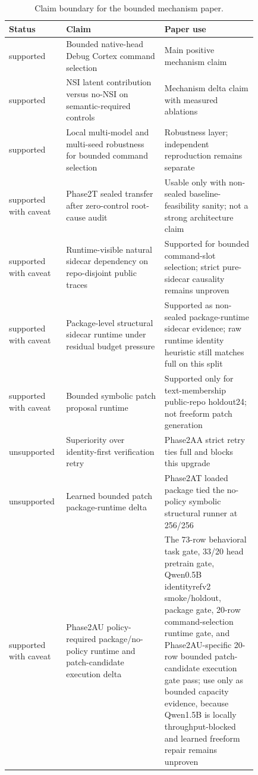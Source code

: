 \begin{table}[ht]
\centering
\scriptsize
\setlength{\tabcolsep}{2pt}
\caption{Claim boundary for the bounded mechanism paper.}
\label{tab:claim-boundary}
\begin{tabular}{@{}>{\raggedright\arraybackslash}p{0.13\linewidth}>{\raggedright\arraybackslash}p{0.36\linewidth}>{\raggedright\arraybackslash}p{0.34\linewidth}@{}}
\toprule
Status & Claim & Paper use \\
\midrule
supported & Bounded native-head Debug Cortex command selection & Main positive mechanism claim \\
supported & NSI latent contribution versus no-NSI on semantic-required controls & Mechanism delta claim with measured ablations \\
supported & Local multi-model and multi-seed robustness for bounded command selection & Robustness layer; independent reproduction remains separate \\
supported with caveat & Phase2T sealed transfer after zero-control root-cause audit & Usable only with non-sealed baseline-feasibility sanity; not a strong architecture claim \\
supported with caveat & Runtime-visible natural sidecar dependency on repo-disjoint public traces & Supported for bounded command-slot selection; strict pure-sidecar causality remains unproven \\
supported with caveat & Package-level structural sidecar runtime under residual budget pressure & Supported as non-sealed package-runtime sidecar evidence; raw runtime identity heuristic still matches full on this split \\
supported with caveat & Bounded symbolic patch proposal runtime & Supported only for text-membership public-repo holdout24; not freeform patch generation \\
unsupported & Superiority over identity-first verification retry & Phase2AA strict retry ties full and blocks this upgrade \\
unsupported & Learned bounded patch package-runtime delta & Phase2AT loaded package tied the no-policy symbolic structural runner at 256/256 \\
supported with caveat & Phase2AU policy-required package/no-policy runtime and patch-candidate execution delta & The 73-row behavioral task gate, 33/20 head pretrain gate, Qwen0.5B identityrefv2 smoke/holdout, package gate, 20-row command-selection runtime gate, and Phase2AU-specific 20-row bounded patch-candidate execution gate pass; use only as bounded capacity evidence, because Qwen1.5B is locally throughput-blocked and learned freeform repair remains unproven \\

\end{tabular}
\end{table}
